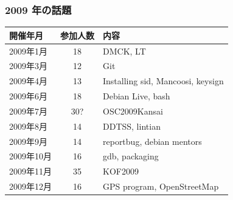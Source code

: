 \documentclass[cjk,dvipdfmx,10pt,compress,%
hyperref={bookmarks=true,bookmarksnumbered=true,bookmarksopen=false,%
colorlinks=false,%
pdftitle={第 121 回 関西 Debian 勉強会},%
pdfauthor={倉敷・のがた・佐々木・かわだ},%
pdfsubject={資料},%
}]{beamer}
\begin{document}
\begin{frame}[fragile]
  \frametitle{2009 年の話題}
    \begin{table}
        \begin{center}
          \begin{tabular}{|l|c|p{16em}|}
            \hline
            開催年月   & 参加人数 & 内容 \\
            \hline
            2009年1月  & 18       & DMCK, LT \\
            2009年3月  & 12       & Git \\
            2009年4月  & 13       & Installing sid, Mancoosi, keysign \\
            2009年6月  & 18       & Debian Live, bash\\
            2009年7月  & 30?      & OSC2009Kansai \\
            2009年8月  & 14       & DDTSS, lintian \\
            2009年9月  & 14       & reportbug, debian mentors\\
            2009年10月 & 16       & gdb, packaging \\
            2009年11月 & 35       & KOF2009 \\
            2009年12月 & 16       & GPS program, OpenStreetMap \\
            \hline
          \end{tabular}
        \end{center}
    \end{table}
\end{frame}
\end{document}
